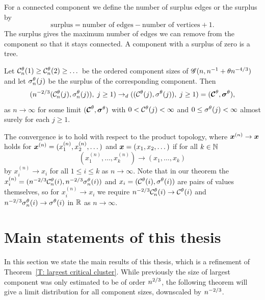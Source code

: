 For a connected component we define the number of surplus edges or the surplus by
\begin{equation}
	\text{surplus} = \text{number of edges} - \text{number of vertices} + 1.
\end{equation}
The surplus gives the maximum number of edges we can remove from the component so that it stays connected.
A component with a surplus of zero is a tree.

\begin{folktheorem} \label{T: folk theorem}
	Let $\mathcal{C}^{\theta}_n(1) \geq \mathcal{C}^{\theta}_n(2) \geq \dots$ be the ordered component sizes of
	$\mathscr{G}(n, n^{-1} + \theta n^{-4 / 3})$ and let $\mathcal{\sigma}^{\theta}_n(j)$ be the surplus of the corresponding component.
	Then
	\begin{equation}
		( n^{-2 / 3} ( \mathcal{C}^{\theta}_n(j), \mathcal{\sigma}^{\theta}_n(j) ), \; j \geq 1 ) 
		\rightarrow_d
		( (\mathcal{C}^{\theta}(j), \mathcal{\sigma}^{\theta}(j)), \; j \geq 1 )
		= ( \boldsymbol{\mathcal{C}}^{\theta}, \boldsymbol{\mathcal{\sigma}}^{\theta} ),
	\end{equation}
	as $n \rightarrow \infty$ for some limit $( \boldsymbol{\mathcal{C}}^{\theta}, \boldsymbol{\mathcal{\sigma}}^{\theta} )$
	with $0 < \mathcal{C}^{\theta}(j) < \infty$ and $0 \leq \mathcal{\sigma}^{\theta}(j) < \infty$ almost surely for each $j \geq 1$.
\end{folktheorem}

The convergence is to hold with respect to the product topology, 
where $\boldsymbol{x}^{(n)} \rightarrow \boldsymbol{x}$ holds for $\boldsymbol{x}^{(n)} = (x^{(n)}_1, x^{(n)}_2, \dots)$ and $\boldsymbol{x} = (x_1, x_2, \dots)$
if for all $k \in \mathbb{N}$
\begin{equation}
	(x^{(n)}_1, \dots, x^{(n)}_k) \rightarrow (x_1, \dots,  x_k)
\end{equation}
by $x^{(n)}_i \rightarrow x_i$ for all $1 \leq i \leq k$ as $n \rightarrow \infty$.
Note that in our theorem the $x^{(n)}_i = ( n^{-2 / 3} \mathcal{C}^{\theta}_n(i), n^{-2 / 3} \mathcal{\sigma}^{\theta}_n(i))$ and $x_i = (\mathcal{C}^{\theta}(i), \mathcal{\sigma}^{\theta}(i))$ are pairs of values themselves,
so for $x^{(n)}_i \rightarrow x_i$ we require $n^{-2 / 3}  \mathcal{C}^{\theta}_n(i) \rightarrow \mathcal{C}^{\theta}(i)$ and $n^{-2 / 3} \mathcal{\sigma}^{\theta}_n(i) \rightarrow \mathcal{\sigma}^{\theta}(i)$ 
in $\mathbb{R}$ as $n \rightarrow \infty$.


\section{Main statements of this thesis}

In this section we state the main results of this thesis,
which is a refinement of Theorem~\ref{T: largest critical cluster}.
While previously the size of largest component was only estimated to be of order $n^{2 / 3}$,
the following theorem will give a limit distribution for all component sizes, downscaled by $n^{-2 / 3}$.

